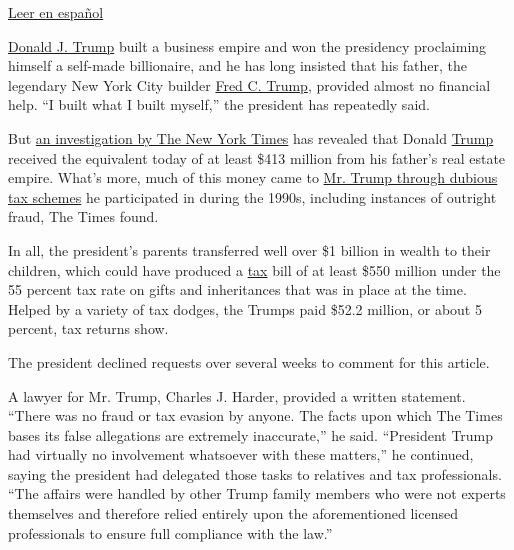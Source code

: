 \href{https://www.nytimes.com/es/2018/10/02/investigacion-fortuna-donald-trump/?}{Leer
en español}

\href{https://www.nytimes.com/2020/07/09/us/politics/trump-taxes.html}{Donald
J. Trump} built a business empire and won the presidency proclaiming
himself a self-made billionaire, and he has long insisted that his
father, the legendary New York City builder
\href{https://www.nytimes.com/2020/07/28/us/politics/donald-fred-trump.html}{Fred
C. Trump}, provided almost no financial help. ``I built what I built
myself,'' the president has repeatedly said.

But
\href{https://www.nytimes.com/interactive/2018/10/02/us/politics/donald-trump-tax-schemes-fred-trump.html}{an
investigation by The New York Times} has revealed that Donald
\href{https://www.nytimes.com/interactive/2018/10/02/us/politics/donald-trump-tax-schemes-fred-trump.html?action=click\&module=Top\%20Stories\&pgtype=Homepage}{Trump}
received the equivalent today of at least \$413 million from his
father's real estate empire. What's more, much of this money came to
\href{https://www.nytimes.com/interactive/2019/05/07/us/politics/donald-trump-taxes.html}{Mr.
Trump through dubious tax schemes} he participated in during the 1990s,
including instances of outright fraud, The Times found.

In all, the president's parents transferred well over \$1 billion in
wealth to their children, which could have produced a
\href{https://www.nytimes.com/2020/07/09/us/politics/trump-taxes.html}{tax}
bill of at least \$550 million under the 55 percent tax rate on gifts
and inheritances that was in place at the time. Helped by a variety of
tax dodges, the Trumps paid \$52.2 million, or about 5 percent, tax
returns show.

The president declined requests over several weeks to comment for this
article.

A lawyer for Mr. Trump, Charles J. Harder, provided a written statement.
``There was no fraud or tax evasion by anyone. The facts upon which The
Times bases its false allegations are extremely inaccurate,'' he said.
``President Trump had virtually no involvement whatsoever with these
matters,'' he continued, saying the president had delegated those tasks
to relatives and tax professionals. ``The affairs were handled by other
Trump family members who were not experts themselves and therefore
relied entirely upon the aforementioned licensed professionals to ensure
full compliance with the law.''

